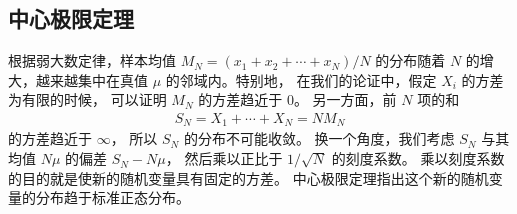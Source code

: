 \documentclass[letterpaper,10pt,english]{sphinxmanual}
\begin{document}
\subsection{中心极限定理}
\label{\detokenize{_u63a8_u65ad_u4e0e_u68c0_u9a8c/content:ch-clt}}\label{\detokenize{_u63a8_u65ad_u4e0e_u68c0_u9a8c/content:id10}}
根据弱大数定律，样本均值 \(M_N=(x_1+x_2+\cdots+x_N)/N\) 的分布随着 \(N\)
的增大，越来越集中在真值 \(\mu\) 的邻域内。特别地，
在我们的论证中，假定 \(X_i\) 的方差为有限的时候，
可以证明 \(M_N\) 的方差趋近于 \(0\)。
另一方面，前 \(N\) 项的和
\begin{equation}\label{equation:推断与检验/content:推断与检验/content:35}
\begin{split}S_N = X_1 + \cdots +X_N = N M_N\end{split}
\end{equation}
的方差趋近于 \(\infty\)，
所以 \(S_N\) 的分布不可能收敛。
换一个角度，我们考虑 \(S_N\)
与其均值 \(N \mu\) 的偏差 \(S_N - N \mu\)，
然后乘以正比于 \(1/\sqrt{N}\) 的刻度系数。
乘以刻度系数的目的就是使新的随机变量具有固定的方差。
中心极限定理指出这个新的随机变量的分布趋于标准正态分布。
\end{document}
